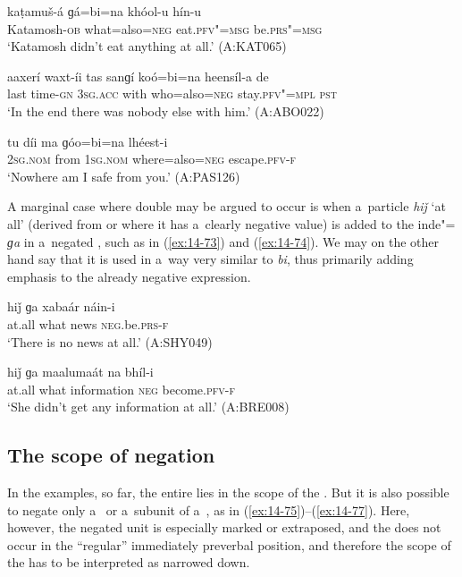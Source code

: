 \begin{exe}
\ex
\label{ex:14-70}
\gll kaṭamuš-á ɡá=bi=na khóol-u hín-u \\
Katamosh-\textsc{ob} what=also=\textsc{neg} eat.\textsc{pfv"=msg } be.\textsc{prs"=msg} \\
\glt `Katamosh didn't eat anything at all.' (A:KAT065)

\ex
\label{ex:14-71}
\gll aaxerí waxt-íi tas sanɡí koó=bi=na heensíl-a  de \\
last time-\textsc{gn} \textsc{3sg.acc} with who=also=\textsc{neg} stay.\textsc{pfv"=mpl}  \textsc{pst} \\
\glt `In the end there was nobody else with him.' (A:ABO022)

\ex
\label{ex:14-72}
\gll tu díi ma ɡóo=bi=na lhéest-i \\
\textsc{2sg.nom} from \textsc{1sg.nom} where=also=\textsc{neg} escape.\textsc{pfv-f}  \\
\glt `Nowhere am I safe from you.' (A:PAS126)
\end{exe}

A marginal case where double  may be argued to occur is when a~particle \textit{hiǰ} `at all' (derived from  or  where it has a~clearly negative value) is added to the inde"= \textit{ɡa} in a~negated , such as in (\ref{ex:14-73}) and (\ref{ex:14-74}). We may on the other hand say that it is used in a~way very similar to \textit{bi}, thus primarily adding emphasis to the already negative expression.

\begin{exe}
\ex
\label{ex:14-73}
\gll hiǰ ɡa xabaár náin-i \\
at.all what news \textsc{neg}.be.\textsc{prs-f}  \\
\glt `There is no news at all.' (A:SHY049)

\ex
\label{ex:14-74}
\gll hiǰ ɡa maalumaát na bhíl-i \\
at.all what information \textsc{neg} become.\textsc{pfv-f } \\
\glt `She didn't get any information at all.' (A:BRE008)
\end{exe}

\subsection{The scope of negation}
\label{subsec:14-3-3}


 In the examples, so far, the entire  lies in the scope of the . But it is also possible to negate only a~ or a~subunit of a~, as in (\ref{ex:14-75})--(\ref{ex:14-77}). Here, however, the negated unit is especially marked or extraposed, and the  does not occur in the ``regular'' immediately preverbal position, and therefore the scope of the  has to be interpreted as narrowed down. 

